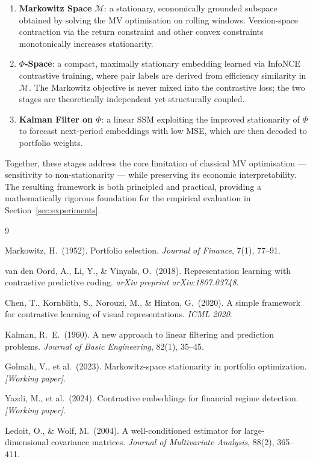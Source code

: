 \documentclass[12pt, a4paper]{report}
\theoremstyle{plain}
\theoremstyle{definition}
\newcommand{\calM}{\mathcal{M}}
\begin{document}
\begin{enumerate}
  \item \textbf{Markowitz Space} $\calM$: a stationary, economically grounded
        subspace obtained by solving the MV optimisation on rolling windows.
        Version-space contraction via the return constraint and other convex
        constraints monotonically increases stationarity.

  \item \textbf{$\Phi$-Space}: a compact, maximally stationary embedding learned
        via InfoNCE contrastive training, where pair labels are derived from
        efficiency similarity in $\calM$.  The Markowitz objective is never
        mixed into the contrastive loss; the two stages are theoretically
        independent yet structurally coupled.

  \item \textbf{Kalman Filter on $\Phi$}: a linear SSM exploiting the improved
        stationarity of $\Phi$ to forecast next-period embeddings with low MSE,
        which are then decoded to portfolio weights.
\end{enumerate}

Together, these stages address the core limitation of classical MV
optimisation — sensitivity to non-stationarity — while preserving its economic
interpretability.  The resulting framework is both principled and practical,
providing a mathematically rigorous foundation for the empirical evaluation in
Section~\ref{sec:experiments}.

\begin{thebibliography}{9}

Markowitz, H.\ (1952).
Portfolio selection.
\textit{Journal of Finance}, 7(1), 77--91.

van den Oord, A., Li, Y., \& Vinyals, O.\ (2018).
Representation learning with contrastive predictive coding.
\textit{arXiv preprint arXiv:1807.03748}.

Chen, T., Kornblith, S., Norouzi, M., \& Hinton, G.\ (2020).
A simple framework for contrastive learning of visual representations.
\textit{ICML 2020}.

Kalman, R.\ E.\ (1960).
A new approach to linear filtering and prediction problems.
\textit{Journal of Basic Engineering}, 82(1), 35--45.

Golmah, V., et al.\ (2023).
Markowitz-space stationarity in portfolio optimization.
\textit{[Working paper]}.

Yazdi, M., et al.\ (2024).
Contrastive embeddings for financial regime detection.
\textit{[Working paper]}.

Ledoit, O., \& Wolf, M.\ (2004).
A well-conditioned estimator for large-dimensional covariance matrices.
\textit{Journal of Multivariate Analysis}, 88(2), 365--411.

\end{thebibliography}
\end{document}
